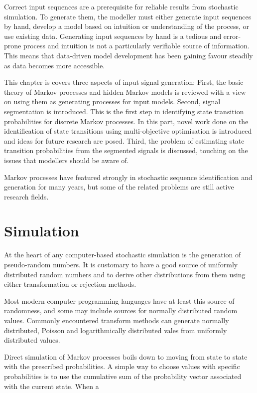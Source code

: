 Correct input sequences are a prerequisite for reliable results from
stochastic simulation.  To generate them, the modeller must either
generate input sequences by hand, develop a model based on intuition
or understanding of the process, or use existing data.  Generating
input sequences by hand is a tedious and error-prone process and
intuition is not a particularly verifiable source of information.
This means that data-driven model development has been gaining favour
steadily as data becomes more accessible.

This chapter is covers three aspects of input signal generation:
First, the basic theory of Markov processes and hidden Markov models
is reviewed with a view on using them as generating processes for
input models. Second, signal segmentation is introduced.  This is the
first step in identifying state transition probabilities for discrete
Markov processes.  In this part, novel work done on the identification
of state transitions using multi-objective optimisation is introduced
and ideas for future research are posed. Third, the problem of
estimating state transition probabilities from the segmented signals
is discussed, touching on the issues that modellers should be aware
of.

Markov processes have featured strongly in stochastic sequence
identification and generation for many years, but some of the related
problems are still active research fields.


\section{Simulation}
At the heart of any computer-based stochastic simulation is the
generation of pseudo-random numbers.  It is customary to have a good
source of uniformly distributed random numbers and to derive other
distributions from them using either transformation or rejection
methods.

Most modern computer programming languages have at least this source
of randomness, and some may include sources for normally distributed
random values.  Commonly encountered transform methods can generate
normally distributed, Poisson and logarithmically distributed vales
from uniformly distributed values.~\citep{gamerman.lopes2006markov}

Direct simulation of Markov processes boils down to moving from state
to state with the prescribed probabilities.  A simple way to choose
values with specific probabilities is to use the cumulative sum of the
probability vector associated with the current state.  When a 

